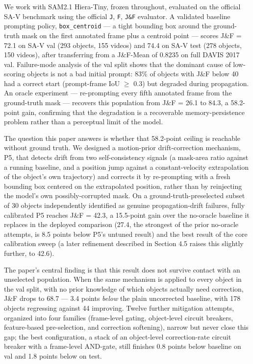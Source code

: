 \documentclass[11pt]{article}
\begin{document}
We work with SAM2.1 Hiera-Tiny, frozen throughout, evaluated on the official SA-V benchmark \citep{metaai2024} using the official \texttt{J}, \texttt{F}, \texttt{J\&F} evaluator. A validated baseline prompting policy, \texttt{box\_centroid} — a tight bounding box around the ground-truth mask on the first annotated frame plus a centroid point — scores J\&F = 72.1 on SA-V val (293 objects, 155 videos) and 74.4 on SA-V test (278 objects, 150 videos), after transferring from a J\&F-Mean of 0.8235 on full DAVIS 2017 val. Failure-mode analysis of the val split shows that the dominant cause of low-scoring objects is not a bad initial prompt: 83\% of objects with J\&F below 40 had a correct start (prompt-frame IoU $\geq$ 0.3) but degraded during propagation. An oracle experiment — re-prompting every fifth annotated frame from the ground-truth mask — recovers this population from J\&F = 26.1 to 84.3, a 58.2-point gain, confirming that the degradation is a recoverable memory-persistence problem rather than a perceptual limit of the model.

The question this paper answers is whether that 58.2-point ceiling is reachable without ground truth. We designed a motion-prior drift-correction mechanism, P5, that detects drift from two self-consistency signals (a mask-area ratio against a running baseline, and a position jump against a constant-velocity extrapolation of the object's own trajectory) and corrects it by re-prompting with a fresh bounding box centered on the extrapolated position, rather than by reinjecting the model's own possibly-corrupted mask. On a ground-truth-preselected subset of 30 objects independently identified as genuine propagation-drift failures, fully calibrated P5 reaches J\&F = 42.3, a 15.5-point gain over the no-oracle baseline it replaces in the deployed comparison (27.4, the strongest of the prior no-oracle attempts, is 8.5 points below P5's untuned result) and the best result of the core calibration sweep (a later refinement described in Section 4.5 raises this slightly further, to 42.6).

The paper's central finding is that this result does not survive contact with an unselected population. When the same mechanism is applied to every object in the val split, with no prior knowledge of which objects actually need correction, J\&F drops to 68.7 — 3.4 points \emph{below} the plain uncorrected baseline, with 178 objects regressing against 44 improving. Twelve further mitigation attempts, organized into four families (frame-level gating, object-level circuit breakers, feature-based pre-selection, and correction softening), narrow but never close this gap; the best configuration, a stack of an object-level correction-rate circuit breaker with a frame-level AND-gate, still finishes 0.8 points below baseline on val and 1.8 points below on test.
\end{document}
